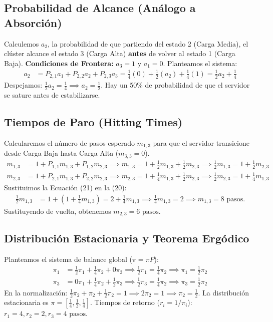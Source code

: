 \documentclass[12pt, a4paper]{article}
\begin{document}
\subsection{Probabilidad de Alcance (Análogo a Absorción)}
Calculemos $a_2$, la probabilidad de que partiendo del estado 2 (Carga Media), el clúster alcance el estado 3 (Carga Alta) \textbf{antes} de volver al estado 1 (Carga Baja).
\textbf{Condiciones de Frontera:} $a_3 = 1$ y $a_1 = 0$. Planteamos el sistema:
\begin{align}
    a_2 &= P_{2,1}a_1 + P_{2,2}a_2 + P_{2,3}a_3 = \frac{1}{4}(0) + \frac{1}{2}(a_2) + \frac{1}{4}(1) = \frac{1}{2}a_2 + \frac{1}{4}
\end{align}
Despejamos: $\frac{1}{2}a_2 = \frac{1}{4} \implies a_2 = \frac{1}{2}$. Hay un 50\% de probabilidad de que el servidor se sature antes de estabilizarse.

\subsection{Tiempos de Paro (Hitting Times)}
Calcularemos el número de pasos esperado $m_{1,3}$ para que el servidor transicione desde Carga Baja hasta Carga Alta ($m_{3,3} = 0$).
\begin{align}
    m_{1,3} &= 1 + P_{1,1}m_{1,3} + P_{1,2}m_{2,3} \implies m_{1,3} = 1 + \frac{1}{2}m_{1,3} + \frac{1}{2}m_{2,3} \implies \frac{1}{2}m_{1,3} = 1 + \frac{1}{2}m_{2,3} \\
    m_{2,3} &= 1 + P_{2,1}m_{1,3} + P_{2,2}m_{2,3} \implies m_{2,3} = 1 + \frac{1}{4}m_{1,3} + \frac{1}{2}m_{2,3} \implies \frac{1}{2}m_{2,3} = 1 + \frac{1}{4}m_{1,3} 
\end{align}
Sustituimos la Ecuación (21) en la (20):
\begin{align*}
    \frac{1}{2}m_{1,3} &= 1 + \left( 1 + \frac{1}{4}m_{1,3} \right) = 2 + \frac{1}{4}m_{1,3} \implies \frac{1}{4}m_{1,3} = 2 \implies m_{1,3} = 8 \text{ pasos.}
\end{align*}
Sustituyendo de vuelta, obtenemos $m_{2,3} = 6 \text{ pasos}$.

\subsection{Distribución Estacionaria y Teorema Ergódico}
Planteamos el sistema de balance global ($\pi = \pi P$):
\begin{align}
    \pi_1 &= \frac{1}{2}\pi_1 + \frac{1}{4}\pi_2 + 0\pi_3 \implies \frac{1}{2}\pi_1 = \frac{1}{4}\pi_2 \implies \pi_1 = \frac{1}{2}\pi_2 \\
    \pi_3 &= 0\pi_1 + \frac{1}{4}\pi_2 + \frac{1}{2}\pi_3 \implies \frac{1}{2}\pi_3 = \frac{1}{4}\pi_2 \implies \pi_3 = \frac{1}{2}\pi_2 
\end{align}
En la normalización: $\frac{1}{2}\pi_2 + \pi_2 + \frac{1}{2}\pi_2 = 1 \implies 2\pi_2 = 1 \implies \pi_2 = \frac{1}{2}$.
La distribución estacionaria es $\pi = \left[ \frac{1}{4}, \frac{1}{2}, \frac{1}{4} \right]$.
Tiempos de retorno ($r_i = 1/\pi_i$): $r_1=4, r_2=2, r_3=4 \text{ pasos}$.
\end{document}
